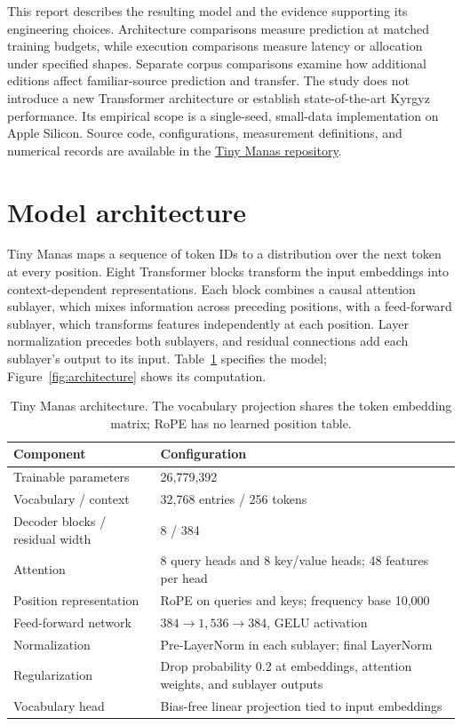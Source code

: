 \documentclass{article}
\begin{document}
This report describes the resulting model and the evidence supporting its engineering choices. Architecture comparisons measure prediction at matched training budgets, while execution comparisons measure latency or allocation under specified shapes. Separate corpus comparisons examine how additional editions affect familiar-source prediction and transfer. The study does not introduce a new Transformer architecture or establish state-of-the-art Kyrgyz performance. Its empirical scope is a single-seed, small-data implementation on Apple Silicon. Source code, configurations, measurement definitions, and numerical records are available in the \href{https://github.com/nik1t7n/tiny-manas}{Tiny Manas repository}.

\section{Model architecture}
\label{sec:model}
Tiny Manas maps a sequence of token IDs to a distribution over the next token at every position. Eight Transformer blocks transform the input embeddings into context-dependent representations. Each block combines a causal attention sublayer, which mixes information across preceding positions, with a feed-forward sublayer, which transforms features independently at each position. Layer normalization precedes both sublayers, and residual connections add each sublayer's output to its input. Table~\ref{tab:architecture} specifies the model; Figure~\ref{fig:architecture} shows its computation.

\begin{table}[ht]
\caption{Tiny Manas architecture. The vocabulary projection shares the token embedding matrix; RoPE has no learned position table.}
\label{tab:architecture}\centering\small
\begin{tabularx}{\linewidth}{lX}
\toprule Component & Configuration \\
\midrule
Trainable parameters & 26,779,392 \\
Vocabulary / context & 32,768 entries / 256 tokens \\
Decoder blocks / residual width & 8 / 384 \\
Attention & 8 query heads and 8 key/value heads; 48 features per head \\
Position representation & RoPE on queries and keys; frequency base 10,000 \\
Feed-forward network & $384 \rightarrow 1,536 \rightarrow 384$, GELU activation \\
Normalization & Pre-LayerNorm in each sublayer; final LayerNorm \\
Regularization & Drop probability 0.2 at embeddings, attention weights, and sublayer outputs \\
Vocabulary head & Bias-free linear projection tied to input embeddings \\
\bottomrule
\end{tabularx}
\end{table}
\end{document}
